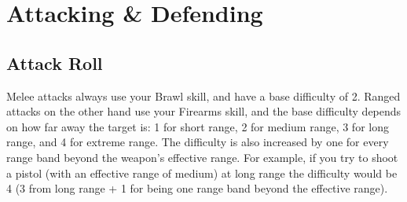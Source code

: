 

\section{Attacking \& Defending}

\subsection{Attack Roll}
Melee attacks always use your Brawl skill, and have a base difficulty of 2.
Ranged attacks on the other hand use your Firearms skill, 
and the base difficulty depends on how far away the target is:
1 for short range, 2 for medium range, 3 for long range, and 4 for extreme range.
The difficulty is also increased by one for every range band beyond the weapon's effective range.
For example, if you try to shoot a pistol (with an effective range of medium) at long range
the difficulty would be 4 (3 from long range + 1 for being one range band beyond the effective range). 


